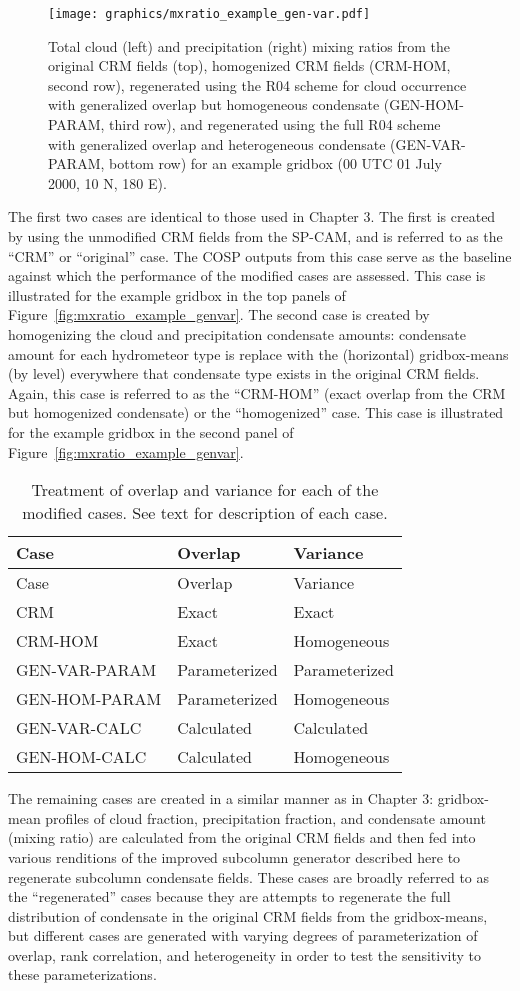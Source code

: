 \begin{figure}[tp]
\centering
\texttt{[image: graphics/mxratio\_example\_gen-var.pdf]}
\caption{\label{fig:mxratio_example_genvar}Total cloud (left) and
precipitation (right) mixing ratios from the original CRM fields (top),
homogenized CRM fields (CRM-HOM, second row), regenerated using the R04
scheme for cloud occurrence with generalized overlap but homogeneous
condensate (GEN-HOM-PARAM, third row), and regenerated using the full
R04 scheme with generalized overlap and heterogeneous condensate
(GEN-VAR-PARAM, bottom row) for an example gridbox (00 UTC 01 July 2000,
10 N, 180 E).}\label{fig:mxratioux5fexampleux5fgenvar}
\end{figure}

The first two cases are identical to those used in Chapter 3. The first
is created by using the unmodified CRM fields from the SP-CAM, and is
referred to as the ``CRM'' or ``original'' case. The COSP outputs from
this case serve as the baseline against which the performance of the
modified cases are assessed. This case is illustrated for the example
gridbox in the top panels of Figure~\ref{fig:mxratio_example_genvar}.
The second case is created by homogenizing the cloud and precipitation
condensate amounts: condensate amount for each hydrometeor type is
replace with the (horizontal) gridbox-means (by level) everywhere that
condensate type exists in the original CRM fields. Again, this case is
referred to as the ``CRM-HOM'' (exact overlap from the CRM but
homogenized condensate) or the ``homogenized'' case. This case is
illustrated for the example gridbox in the second panel of
Figure~\ref{fig:mxratio_example_genvar}.

\begin{longtable}[]{@{}lll@{}}
\caption{\label{tbl:subgrid_cases}Treatment of overlap and variance for
each of the modified cases. See text for description of each case.
}\tabularnewline
\toprule
Case & Overlap & Variance\tabularnewline
\midrule
\endfirsthead
\toprule
Case & Overlap & Variance\tabularnewline
\midrule
\endhead
CRM & Exact & Exact\tabularnewline
CRM-HOM & Exact & Homogeneous\tabularnewline
GEN-VAR-PARAM & Parameterized & Parameterized\tabularnewline
GEN-HOM-PARAM & Parameterized & Homogeneous\tabularnewline
GEN-VAR-CALC & Calculated & Calculated\tabularnewline
GEN-HOM-CALC & Calculated & Homogeneous\tabularnewline
\bottomrule
\end{longtable}

The remaining cases are created in a similar manner as in Chapter 3:
gridbox-mean profiles of cloud fraction, precipitation fraction, and
condensate amount (mixing ratio) are calculated from the original CRM
fields and then fed into various renditions of the improved subcolumn
generator described here to regenerate subcolumn condensate fields.
These cases are broadly referred to as the ``regenerated'' cases because
they are attempts to regenerate the full distribution of condensate in
the original CRM fields from the gridbox-means, but different cases are
generated with varying degrees of parameterization of overlap, rank
correlation, and heterogeneity in order to test the sensitivity to these
parameterizations.

